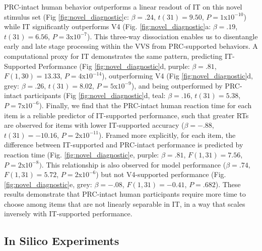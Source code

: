 \documentclass[11pt]{article}
\begin{document}
PRC-intact human behavior outperforms a linear readout of IT on this novel stimulus set (Fig \ref{fig:novel_diagnostic}c:  $\beta = .24$,  $t(31) = 9.50$, $P = 1$x$10^{-10}$) while IT significantly outperforms V4 (Fig. \ref{fig:novel_diagnostic}a:  $\beta = .19$,  $t(31) = 6.56$, $P = 3$x$10^{-7}$). This three-way dissociation enables us to disentangle early and late stage processing within the VVS from PRC-supported behaviors. A computational proxy for IT demonstrates the same pattern, predicting IT-Supported Performance (Fig \ref{fig:novel_diagnostic}d, purple: $\beta = .81$, $F(1, 30) = 13.33$, $P = 4$x$10^{-14}$), outperforming V4 (Fig \ref{fig:novel_diagnostic}d, grey: $\beta = .26$,  $t(31) = 8.02$, $P = 5$x$10^{-9}$), and being outperformed by PRC-intact participants (Fig \ref{fig:novel_diagnostic}d, teal: $\beta = .16$, $t(31) = 5.38$, $P = 7$x$10^{-6}$). Finally, we find that the PRC-intact human reaction time for each item is a reliable predictor of IT-supported performance, such that greater RTs are observed for items with lower IT-supported accuracy ($\beta = -.88$,  $t(31) = -10.16$, $P = 2$x$10^{-11}$). Framed more explicitly, for each item, the difference between IT-supported and PRC-intact performance is predicted by reaction time (Fig. \ref{fig:novel_diagnostic}e, purple: $\beta = .81$,  $F(1, 31) = 7.56$, $P = 2$x$10^{-8})$. This relationship is also observed for model performance ($\beta = .74$,  $F(1, 31) = 5.72$, $P = 2$x$10^{-6}$) but not V4-supported performance (Fig. \ref{fig:novel_diagnostic}e, grey: $\beta = -.08$,  $F(1, 31) = -0.41$, $P = .682$). These results demonstrate that PRC-intact human participants require more time to choose among items that are not linearly separable in IT, in a way that scales inversely with IT-supported performance. 

\subsection{In Silico Experiments} 
\end{document}

